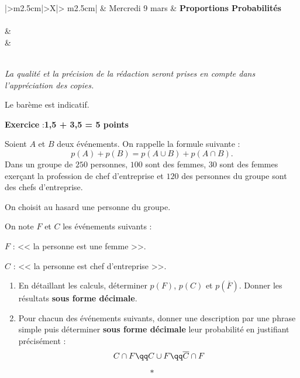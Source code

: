 \documentclass[10pt,french]{book}
\newcounter{exoc}
\newenvironment{exoc}[1]{%
  \refstepcounter{exoc}\textbf{Exercice \theexoc} :\hfill {\textbf{#1}}\par
  \medskip}%
{\medskip}
\begin{document}
\pagestyle{empty}

\begin{center}
\renewcommand\arraystretch{1.5}
\begin{tabularx}{\textwidth}{|>\centering m{2.5cm}|>\centering X|>{\centering\arraybackslash} m{2.5cm}|}
	\iere {} & Mercredi 9 mars  & \textbf{Proportions Probabilités} \\
	\hline
		 \\
	\hline
         &  \\
		 &  \\
	\hline
         \\[1cm]
    \hline
\end{tabularx}\bigskip
\renewcommand\arraystretch{1}

{\itshape
La qualité et la précision de la rédaction seront prises en compte dans l'appréciation des copies.\par
Le barème est indicatif.}
\end{center}

\begin{exoc}{1,5 + 3,5 = 5 points}
    Soient $A$ et $B$ deux événements. On rappelle la formule suivante :
    \[p(A) + p(B) = p(A \cup B) + p(A \cap B).\]
    Dans un groupe de $250$ personnes, $100$ sont des femmes, $30$ sont des femmes exerçant la profession de chef d'entreprise et $120$ des personnes du groupe sont des chefs d'entreprise.\par
    On choisit au hasard une personne du groupe.\par
    On note $F$ et $C$ les événements suivants :\par
    $F$ : << la personne est une femme >>.\par
    $C$ : << la personne est chef d'entreprise >>.
    \begin{enumerate}
        \item En détaillant les calculs, déterminer $p(F)$, $p(C)$ et $p\left(\overline F\right)$. Donner les résultats \textbf{sous forme décimale}.
        \item Pour chacun des événements suivants, donner une description par une phrase simple puis déterminer \textbf{sous forme décimale} leur probabilité en justifiant précisément :
            \[C \cap F \qq C \cup F \qq \overline C \cap F \]
    \end{enumerate}
\end{exoc}\[*\]
\end{document}
